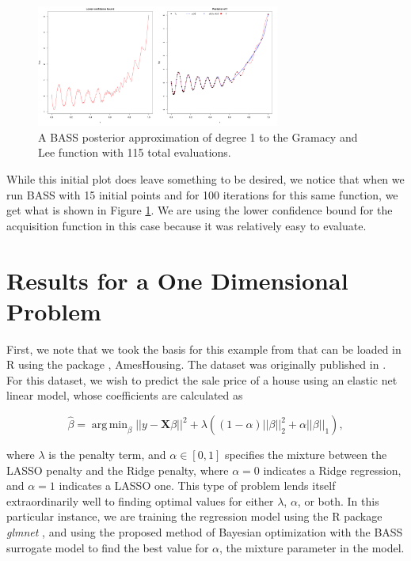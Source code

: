 \documentclass[%
 aip,
 amsmath,amssymb,
 reprint,%
]{revtex4-1}
\DeclareMathOperator*{\argmin}{arg\,min}
\begin{document}
\begin{figure}
	\centering
	\includegraphics[width=8cm]{Figures/lowerbound.png}
	\caption{A BASS posterior approximation of degree 1 to the Gramacy and Lee function \cite{gramacy2012cases} with 115 total evaluations.}
	\label{gram115}
\end{figure}

While this initial plot does leave something to be desired, we notice that when we run BASS with 15 initial points and for 100 iterations for this same function, we get what is shown in Figure \ref{gram115}. We are using the lower confidence bound for the acquisition function in this case because it was relatively easy to evaluate.  



\section{Results for a One Dimensional Problem}

First, we note that we took the basis for this example from  that can be loaded in R using the package , AmesHousing. The dataset was originally published in . For this dataset, we wish to predict the sale price of a house using an elastic net \cite{zou2005regularization} linear model, whose coefficients are calculated as 

\[ \hat \beta = \argmin_{\beta} ||y - \boldsymbol{X} \beta||^2 + \lambda \left( (1 - \alpha) ||\beta||_2^2 + \alpha||\beta||_1 \right), \]

where $\lambda$ is the penalty term, and $\alpha \in [0,1]$ specifies the mixture between the LASSO penalty and the Ridge penalty, where $\alpha = 0$ indicates a Ridge regression, and $\alpha = 1$ indicates a LASSO one. This type of problem lends itself extraordinarily well to finding optimal values for either $\lambda$, $\alpha$, or both. In this particular instance, we are training the regression model using the R package \textit{glmnet} \cite{glmnet}, and using the proposed method of Bayesian optimization with the BASS surrogate model to find the best value for $\alpha$, the mixture parameter in the model. 
\end{document}
